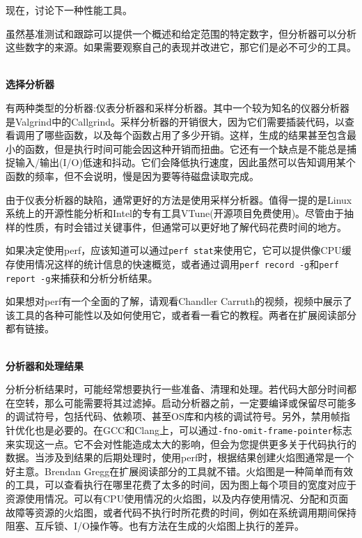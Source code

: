 现在，讨论下一种性能工具。


虽然基准测试和跟踪可以提供一个概述和给定范围的特定数字，但分析器可以分析这些数字的来源。如果需要观察自己的表现并改进它，那它们是必不可少的工具。

\hspace*{\fill} \\ %
\noindent
\textbf{选择分析器}

有两种类型的分析器:仪表分析器和采样分析器。其中一个较为知名的仪器分析器是Valgrind中的Callgrind。采样分析器的开销很大，因为它们需要插装代码，以查看调用了哪些函数，以及每个函数占用了多少开销。这样，生成的结果甚至包含最小的函数，但是执行时间可能会因这种开销而扭曲。它还有一个缺点是不能总是捕捉输入/输出(I/O)低速和抖动。它们会降低执行速度，因此虽然可以告知调用某个函数的频率，但不会说明，慢是因为要等待磁盘读取完成。

由于仪表分析器的缺陷，通常更好的方法是使用采样分析器。值得一提的是Linux系统上的开源性能分析和Intel的专有工具VTune(开源项目免费使用)。尽管由于抽样的性质，有时会错过关键事件，但通常可以更好地了解代码花费时间的地方。

如果决定使用perf，应该知道可以通过\texttt{perf stat}来使用它，它可以提供像CPU缓存使用情况这样的统计信息的快速概览，或者通过调用\texttt{perf record -g}和\texttt{perf report -g}来捕获和分析分析结果。

如果想对perf有一个全面的了解，请观看Chandler Carruth的视频，视频中展示了该工具的各种可能性以及如何使用它，或者看一看它的教程。两者在扩展阅读部分都有链接。

\hspace*{\fill} \\ %
\noindent
\textbf{分析器和处理结果}

分析分析结果时，可能经常想要执行一些准备、清理和处理。若代码大部分时间都在空转，那么可能需要将其过滤掉。启动分析器之前，一定要编译或保留尽可能多的调试符号，包括代码、依赖项、甚至OS库和内核的调试符号。另外，禁用帧指针优化也是必要的。在GCC和Clang上，可以通过\texttt{-fno-omit-frame-pointer}标志来实现这一点。它不会对性能造成太大的影响，但会为您提供更多关于代码执行的数据。当涉及到结果的后期处理时，使用perf时，根据结果创建火焰图通常是一个好主意。Brendan Gregg在扩展阅读部分的工具就不错。火焰图是一种简单而有效的工具，可以查看执行在哪里花费了太多的时间，因为图上每个项目的宽度对应于资源使用情况。可以有CPU使用情况的火焰图，以及内存使用情况、分配和页面故障等资源的火焰图，或者代码不执行时所花费的时间，例如在系统调用期间保持阻塞、互斥锁、I/O操作等。也有方法在生成的火焰图上执行的差异。

